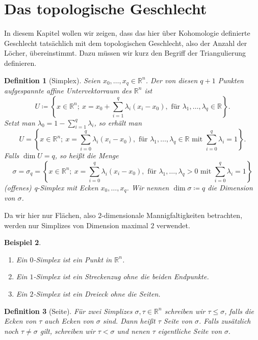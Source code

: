 \documentclass[11pt,a4paper,toc=bibliography]{scrartcl}
\theoremstyle{def}
\newtheorem{defi}{Definition}[section]
\theoremstyle{thm}
\newtheorem{bsp}[defi]{Beispiel}
\theoremstyle{remark}
\begin{document}
\section{Das topologische Geschlecht}
In diesem Kapitel wollen wir zeigen, dass das hier über Kohomologie definierte Geschlecht tatsächlich mit dem topologischen Geschlecht, also der Anzahl der Löcher, übereinstimmt.
Dazu müssen wir kurz den Begriff der Triangulierung definieren.
\nomenclature[O]{$\sigma$}{\nomrefpage}
\begin{defi}[Simplex]
Seien $x_0,\ldots,x_q\in \mathbb{R}^n$. Der von diesen $q+1$ Punkten aufgespannte affine Untervektorraum des $\mathbb{R}^n$ ist 
\[
U\coloneqq \left\{x\in\mathbb{R}^n;~x=x_0+\sum_{i=1}^q \lambda_i(x_i-x_0),\text{ für }\lambda_1,\ldots,\lambda_q\in\mathbb{R}\right\}.
\]
Setzt man $\lambda_0=1-\sum_{i=1}^q \lambda_i$, so erhält man
\[
U= \left\{x\in\mathbb{R}^n;~x=\sum_{i=0}^q \lambda_i(x_i-x_0),\text{ für }\lambda_1,\ldots,\lambda_q\in\mathbb{R}\text{ mit } \sum_{i=0}^q \lambda_i =1\right\}.
\]
Falls $\dim U =q$, so heißt die Menge
\[
\sigma=\sigma_q=\left\{x\in\mathbb{R}^n;~x=\sum_{i=0}^q \lambda_i(x_i-x_0),\text{ für }\lambda_1,\ldots,\lambda_q>0\text{ mit } \sum_{i=0}^q \lambda_i =1\right\}
\]
\emph{(offenes) q-Simplex} mit \emph{Ecken} $x_0,\ldots,x_q$. Wir nennen $\dim \sigma \coloneqq q$ die \emph{Dimension} von $\sigma$.
\end{defi}
Da wir hier nur Flächen, also $2$-dimensionale Mannigfaltigkeiten betrachten, werden nur Simplizes von Dimension maximal $2$ verwendet.
\begin{bsp}
\begin{enumerate}
    \item Ein $0$-Simplex ist ein Punkt in $\mathbb{R}^n$.
    \item Ein $1$-Simplex ist ein Streckenzug ohne die beiden Endpunkte.
    \item Ein $2$-Simplex ist ein Dreieck ohne die Seiten.
\end{enumerate}
\end{bsp}
\nomenclature[O]{$\sigma<\tau$}{\nomrefpage}
\begin{defi}[Seite]
Für zwei Simplizes $\sigma,\tau\in\mathbb{R}^n$ schreiben wir $\tau\leq\sigma$, falls die Ecken von $\tau$ auch Ecken von $\sigma$ sind. Dann heißt $\tau$ \emph{Seite} von $\sigma$. Falls zusätzlich noch $\tau \neq \sigma$ gilt, schreiben wir $\tau <\sigma$ und nenen $\tau$ \emph{eigentliche Seite} von $\sigma.$
\end{defi}
\end{document}
